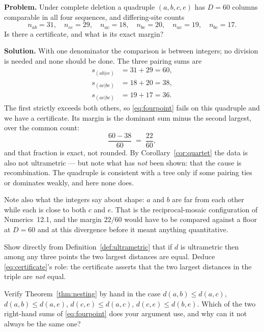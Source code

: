 \begin{worked}
\textbf{Problem.} Under complete deletion a quadruple $(a,b,c,e)$ has $D = 60$
columns comparable in all four sequences, and differing-site counts
\[
  n_{ab} = 31,\quad n_{ce} = 29,\quad
  n_{ac} = 18,\quad n_{be} = 20,\quad
  n_{ae} = 19,\quad n_{bc} = 17.
\]
Is there a certificate, and what is its exact margin?

\textbf{Solution.} With one denominator the comparison is between integers; no
division is needed and none should be done. The three pairing sums are
\begin{align*}
  s_{(ab|ce)} &= 31 + 29 = 60, \\
  s_{(ac|be)} &= 18 + 20 = 38, \\
  s_{(ae|bc)} &= 19 + 17 = 36 .
\end{align*}
The first strictly exceeds both others, so \eqref{eq:fourpoint} fails on this
quadruple and we have a certificate. Its margin is the dominant sum minus the
second largest, over the common count:
\[
  \frac{60 - 38}{60} \;=\; \frac{22}{60},
\]
and that fraction is exact, not rounded. By Corollary~\ref{cor:quartet} the data
is also not ultrametric --- but note what has \emph{not} been shown: that the
cause is recombination. The quadruple is consistent with a tree only if some
pairing ties or dominates weakly, and here none does.

Note also what the integers say about shape: $a$ and $b$ are far from each other
while each is close to both $c$ and $e$. That is the reciprocal-mosaic
configuration of Numerics~12.1, and the margin $22/60$ would have to be compared
against a floor at $D = 60$ and at this divergence before it meant anything
quantitative.
\end{worked}

\begin{exercise}
Show directly from Definition~\ref{def:ultrametric} that if $d$ is ultrametric
then among any three points the two largest distances are equal. Deduce
\eqref{eq:certificate}'s role: the certificate asserts that the two largest
distances in the triple are \emph{not} equal.
\end{exercise}

\begin{exercise}
Verify Theorem~\ref{thm:nesting} by hand in the case
$d(a,b) \le d(a,c)$, $d(a,b) \le d(a,e)$, $d(c,e) \le d(a,c)$,
$d(c,e) \le d(b,e)$. Which of the two right-hand sums of \eqref{eq:fourpoint}
does your argument use, and why can it not always be the same one?
\end{exercise}

